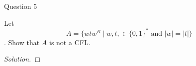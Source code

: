 \begin{solution}{Question 5}\label{ques:5}
    \begin{question}
     Let $$A = \{wtw^R\mid w,t, \in \{0,1\}^* \text{ \ and \ } |w| = |t|\}$$. Show that $A$ is not a CFL.
    \end{question}
    \tcblower{}
    \begin{proof}[Solution]
    \end{proof}
\end{solution}
